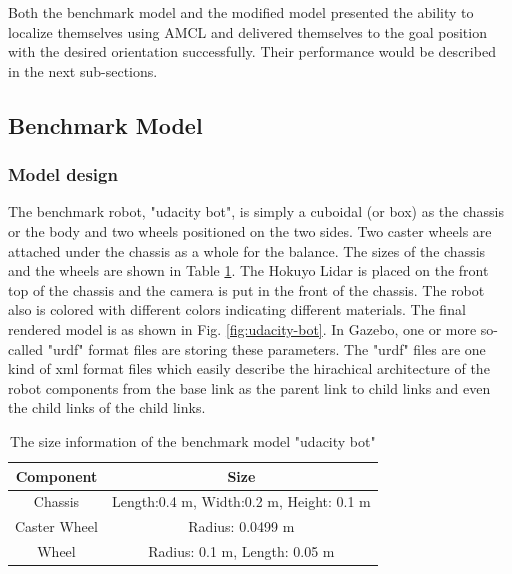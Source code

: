 \documentclass[10pt,journal,compsoc]{IEEEtran}
\begin{document}
Both the benchmark model and the modified model presented the ability to localize themselves using AMCL and delivered themselves to the goal position with the desired orientation successfully. Their performance would be described in the next sub-sections.

\subsection{Benchmark Model}

\subsubsection{Model design}

The benchmark robot, "udacity bot", is simply a cuboidal (or box) as the chassis or the body and two wheels positioned on the two sides. Two caster wheels are attached under the chassis as a whole for the balance. The sizes of the chassis and the wheels are shown in Table \ref{tab:udacity-bot-size}. The Hokuyo Lidar is placed on the front top of the chassis and the camera is put in the front of the chassis. The robot also is colored with different colors indicating different materials. The final rendered model is as shown in Fig. \ref{fig:udacity-bot}. In Gazebo, one or more so-called "urdf" format files are storing these parameters. The "urdf" files are one kind of xml format files which easily describe the hirachical architecture of the robot components from the base link as the parent link to child links and even the child links of the child links.

\begin{table}[h]
    \caption{The size information of the benchmark model "udacity bot"}
    \label{tab:udacity-bot-size}
    \centering
    \begin{tabular}{c|c}
    \hline
    Component & Size \\
    \hline
    Chassis & Length:0.4 m, Width:0.2 m, Height: 0.1 m \\
    \hline
    Caster Wheel & Radius: 0.0499 m \\
    \hline
    Wheel & Radius: 0.1 m, Length: 0.05 m\\
    \hline
    \end{tabular}
\end{table}
\end{document}
